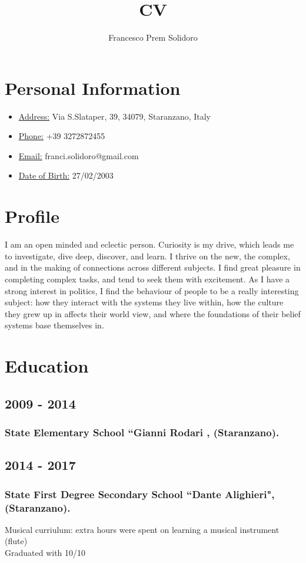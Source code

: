 \documentclass[12pt]{article}
\author{Francesco Prem Solidoro}
\title{CV}
\renewcommand{\maketitle}{
\begin{center}
{\huge\bfseries
\theauthor}
\end{center}
}
\begin{document}
\maketitle
\section{Personal Information}
\begin{itemize}
	\item \underline {Address:} Via S.Slataper, 39, 34079, Staranzano, Italy
	\item \underline {Phone:} +39 3272872455
	\item \underline{Email:} franci.solidoro@gmail.com
	\item \underline{Date of Birth:} 27/02/2003
\end{itemize}
\section{Profile}
I am an open minded and eclectic person. Curiosity is my drive, which leads me to investigate, dive deep, discover, and learn. I thrive on the new, the complex, and in the making of connections across
different subjects. I find great pleasure in completing complex tasks, and tend to seek them with excitement. As I have a strong interest in politics, I find the behaviour of people to be a really
interesting subject: how they interact with the systems they live within, how the culture they grew up in affects their world view, and where the foundations of their belief systems base themselves in.
\section{Education}
\subsection{2009 - 2014}
\subsubsection{State Elementary School ``Gianni Rodari , (Staranzano).}
\subsection{2014 - 2017}
\subsubsection{State First Degree Secondary School ``Dante Alighieri", (Staranzano).}
Musical curriulum: extra hours were spent on learning a musical instrument (flute) \\
Graduated with 10/10
\end{document}
